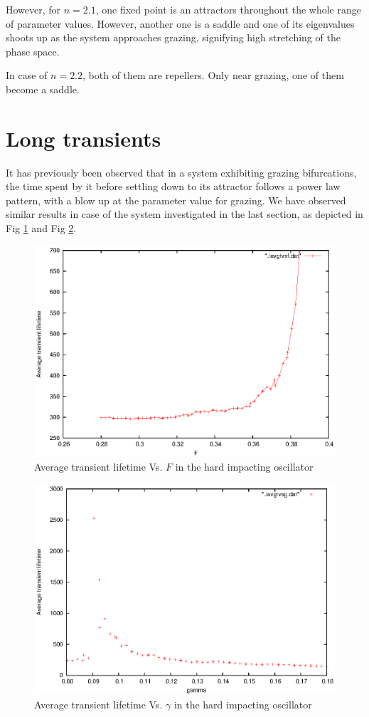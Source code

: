 \documentclass{book}
\renewcommand{\(}{\begin{columns}}
\renewcommand{\)}{\end{columns}}
\newcommand{\<}[1]{\begin{column}{#1}}
\renewcommand{\>}{\end{column}}
\begin{document}
However, for $n=2.1$, one fixed point is an attractors throughout the whole 
range of parameter values.  However, another one is a saddle and one of its 
eigenvalues shoots up as the system approaches grazing, signifying high 
stretching of the phase space.  


In case of $n=2.2$, both of them are repellers.  Only near grazing, one of 
them become a saddle.   



\section{Long transients}
It has previously been observed that in a system exhibiting grazing 
bifurcations, the time spent by it before settling down to its attractor 
follows a power law pattern, with a blow up at the parameter value for 
grazing.  We have observed similar results in case of  the system investigated 
in the last section, as depicted in Fig \ref{fig-tvsf} and Fig \ref{fig-tvsg}. 

\begin{figure}[!htb]
\caption{Average transient lifetime Vs.  $F$ in the hard impacting oscillator}
\label{fig-tvsf}
\begin{center}
\includegraphics[width=0.7\columnwidth]{avgtauvsf-wofit}
\end{center}
\end{figure}

\begin{figure}[!htp]
\caption{Average transient lifetime Vs.  $\gamma$ in the hard impacting oscillator}
\label{fig-tvsg}
\begin{center}
\includegraphics[width=0.7\columnwidth]{avgtauvsg-wofit}
\end{center}
\end{figure}
\end{document}
